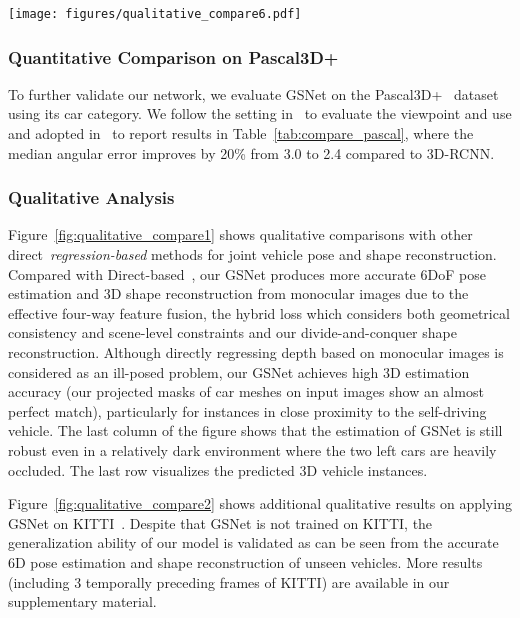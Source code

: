 \documentclass[runningheads]{llncs}
\begin{document}
\begin{figure*}[!t]
	\centering
	\texttt{[image: figures/qualitative\_compare6.pdf]}
	\caption{Cross-dataset generalization of GSNet on KITTI~\cite{geiger2012we} dataset. The first row are the input images and the second row are our reconstructed 3D car meshes projected onto the original image. Additional results are shown in our supplementary material.}
	\label{fig:qualitative_compare2}
\end{figure*}


\subsubsection{Quantitative Comparison on Pascal3D+}
To further validate our network, we evaluate GSNet on the Pascal3D+~\cite{xiang2014beyond} dataset using its car category. We follow the setting in~\cite{kundu20183d,mousavian20173d} to evaluate the viewpoint and use  and  adopted in~\cite{mousavian20173d,tulsiani2015viewpoints} to report results in Table~\ref{tab:compare_pascal}, where the median angular error improves by 20\% from 3.0 to 2.4 compared to 3D-RCNN.

\subsubsection{Qualitative Analysis}
\label{sec:qualitative_analysis}
Figure~\ref{fig:qualitative_compare1} shows qualitative comparisons with other direct~\textit{regression-based} methods for joint vehicle pose and shape reconstruction. Compared with Direct-based~\cite{song2019apollocar3d}, our GSNet produces more accurate 6DoF pose estimation and 3D shape reconstruction from monocular images due to the effective four-way feature fusion, the hybrid loss which considers both geometrical consistency and scene-level constraints and our divide-and-conquer shape reconstruction. Although directly regressing depth based on monocular images is considered as an ill-posed problem, our GSNet achieves high 3D estimation accuracy (our projected masks of car meshes on input images show an almost perfect match), particularly for instances in close proximity to the self-driving vehicle.
The last column of the figure shows that the estimation of GSNet is still robust even in a relatively dark environment where the two left cars are heavily occluded. The last row visualizes the predicted 3D vehicle instances.

Figure~\ref{fig:qualitative_compare2} shows additional qualitative results on applying GSNet on KITTI~\cite{geiger2012we}. Despite that GSNet is not trained on KITTI, the generalization ability of our model is validated as can be seen from the accurate 6D pose estimation and shape reconstruction of unseen vehicles. More results (including 3 temporally preceding frames of KITTI) are available in our supplementary material. 
\end{document}
